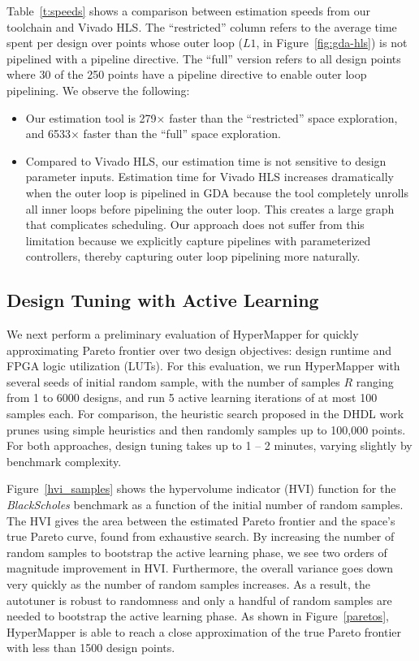 Table~\ref{t:speeds} shows a comparison between estimation speeds from our toolchain and Vivado HLS.
The ``restricted'' column refers to the average time spent per design over points whose outer loop ($L1$, in Figure~\ref{fig:gda-hls})
is not pipelined with a pipeline directive. The ``full'' version refers to all design points where 30 of the 250 points
have a pipeline directive to enable outer loop pipelining. We observe the following:
\begin{itemize}
  \item Our estimation tool is 279$\times$ faster than the ``restricted'' space exploration, and 6533$\times$ faster than the ``full'' space exploration.
  \item Compared to Vivado HLS, our estimation time is not sensitive to design parameter inputs. Estimation time for Vivado HLS increases
    dramatically when the outer loop is pipelined in GDA because the tool completely unrolls all inner loops
    before pipelining the outer loop. This creates a large graph that complicates scheduling. Our approach does not
    suffer from this limitation because we explicitly capture pipelines with parameterized controllers, thereby capturing outer loop pipelining more naturally.
\end{itemize}

\subsection{Design Tuning with Active Learning}
We next perform a preliminary evaluation of HyperMapper for quickly approximating Pareto frontier over two design objectives: design runtime and FPGA logic utilization (LUTs).
For this evaluation, we run HyperMapper with several seeds of initial random sample, with the number of samples $R$ ranging from 1 to 6000 designs, and run 5 active learning iterations of at most 100 samples each. For comparison, the heuristic search proposed in the DHDL work~\cite{dhdl} prunes using simple heuristics and then randomly samples up to 100,000 points. For both approaches, design tuning takes up to 1 -- 2 minutes, varying slightly by benchmark complexity.

Figure~\ref{hvi_samples} shows the hypervolume indicator (HVI) function
for the \emph{BlackScholes} benchmark as a function of the initial
number of random samples.
The HVI gives the area between the estimated Pareto frontier and the space's true Pareto curve, found from exhaustive search.
By increasing
the number of random samples to bootstrap the active learning phase,
we see two orders
of magnitude improvement in HVI. Furthermore, the overall variance goes down very
quickly as the number of random
samples increases. As a result, the autotuner is robust
to randomness and only a handful of random samples are
needed to bootstrap the active learning phase. As shown in Figure~\ref{paretos},
HyperMapper is able to reach a close approximation of
the true Pareto frontier with less than 1500 design points.

